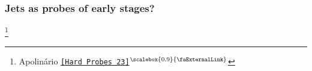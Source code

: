 \documentclass[aspectratio=169,11pt,usenames,dvipsnames]{beamer}
\renewcommand{\thefootnote}{\color{customblue}\faPaperPlaneO}
\newcommand\blfootnote[1]{%
  \begingroup
  \renewcommand\thefootnote{}\footnote{#1}%
  \addtocounter{footnote}{-1}%
  \endgroup
}
\begin{document}
\begin{frame}[noframenumbering]
    \frametitle{Jets as probes of {\color{jyured}early stages}?}
    \blfootnote{\scriptsize Apolinário \href{https://indico.uni-muenster.de/event/1409/contributions/2412/}{{\color{jyured}\texttt{[Hard Probes 23]$^\text{\scalebox{0.9}{\faExternalLink}}$}}}}

\end{frame}
\end{document}
